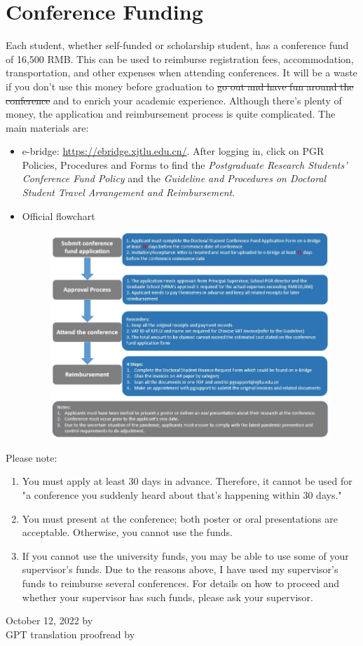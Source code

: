 \section{Conference Funding}
\label{sec.fund}

Each student, whether self-funded or scholarship student, has a conference fund of 16,500 RMB. This can be used to reimburse registration fees, accommodation, transportation, and other expenses when attending conferences. It will be a waste if you don't use this money before graduation to \sout{go out and have fun around the conference} and to enrich your academic experience. Although there's plenty of money, the application and reimbursement process is quite complicated. The main materials are:

\begin{itemize}
    \item e-bridge: \url{https://ebridge.xjtlu.edu.cn/}. After logging in, click on PGR Policies, Procedures and Forms to find the \textit{Postgraduate Research Students' Conference Fund Policy} and the \textit{Guideline and Procedures on Doctoral Student Travel Arrangement and Reimbursement}.
    \item Official flowchart
    \begin{figure}[H]
        \centering
        \includegraphics[width=0.9\columnwidth]{author-folder/Kai.Wu/fund-flowchart.jpg}
    \end{figure}
\end{itemize}

Please note:
\begin{enumerate}
    \item You must apply at least 30 days in advance. Therefore, it cannot be used for "a conference you suddenly heard about that's happening within 30 days."
    \item You must present at the conference; both poster or oral presentations are acceptable. Otherwise, you cannot use the funds.
    \item If you cannot use the university funds, you may be able to use some of your supervisor's funds. Due to the reasons above, I have used my supervisor's funds to reimburse several conferences. For details on how to proceed and whether your supervisor has such funds, please ask your supervisor.
\end{enumerate}

\begin{flushright}
    October 12, 2022 by \Wu \\
    GPT translation proofread by \Shiyao
\end{flushright}
